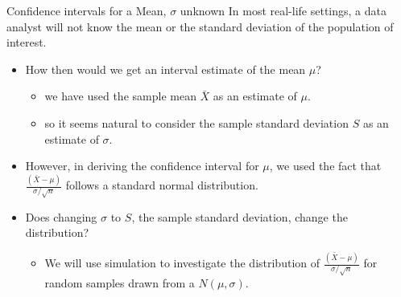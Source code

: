 \documentclass[
  ignorenonframetext,
]{beamer}
\providecommand{\tightlist}{%
  \setlength{\itemsep}{0pt}\setlength{\parskip}{0pt}}
\begin{document}
\begin{frame}{Confidence intervals for a Mean, \(\sigma\) unknown}
\label{confidence-intervals-for-a-mean-sigma-unknown}
In most real-life settings, a data analyst will not know the mean or the
standard deviation of the population of interest.

\begin{itemize}
\item
  How then would we get an interval estimate of the mean \(\mu\)?

  \begin{itemize}
  \tightlist
  \item
    we have used the sample mean \(\bar{X}\) as an estimate of \(\mu\).
  \item
    so it seems natural to consider the sample standard deviation \(S\)
    as an estimate of \(\sigma\).
  \end{itemize}
\item
  However, in deriving the confidence interval for \(\mu\), we used the
  fact that \(\frac{(\bar{X}-\mu)}{\sigma/\sqrt{n}}\) follows a standard
  normal distribution.
\item
  Does changing \(\sigma\) to \(S\), the sample standard deviation,
  change the distribution?

  \begin{itemize}
  \tightlist
  \item
    We will use simulation to investigate the distribution of
    \(\frac{(\bar{X}-\mu)}{\sigma/\sqrt{n}}\) for random samples drawn
    from a \(N(\mu, \sigma)\).
  \end{itemize}
\end{itemize}
\end{frame}
\end{document}
